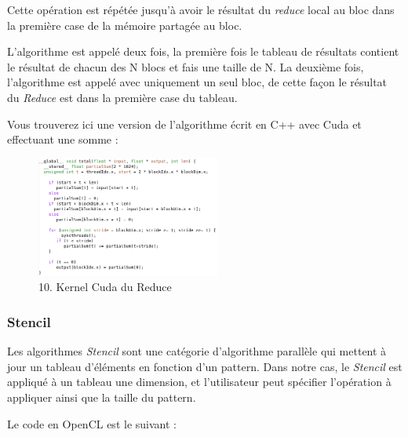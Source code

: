 \documentclass{report}
\begin{document}
\begin{enumerate}
Cette opération est répétée jusqu'à avoir le résultat du \textit{reduce} local au bloc dans la première case de la mémoire partagée au bloc.\newline

L'algorithme est appelé deux fois, la première fois le tableau de résultats contient le résultat de chacun des N blocs et fais une taille de N. La deuxième fois, l'algorithme est appelé avec uniquement un seul bloc, de cette façon le résultat du \textit{Reduce} est dans la première case du tableau.\newline

Vous trouverez ici une version de l'algorithme écrit en C++ avec Cuda et effectuant une somme :
 
\begin{figure}[!h]
\begin{center}
\includegraphics[height=150]{reduce.png}
\end{center}
\caption{10. Kernel Cuda du Reduce}
\label{test}
\end{figure} \newline

\subsubsection{Stencil}
Les algorithmes \textit{Stencil} sont une catégorie d'algorithme parallèle qui mettent à jour un tableau d'éléments en fonction d'un pattern. Dans notre cas, le \textit{Stencil} est appliqué à un tableau une dimension, et l'utilisateur peut spécifier l'opération à appliquer ainsi que la taille du pattern.\newline

Le code en OpenCL est le suivant :


\end{enumerate}
\end{document}

